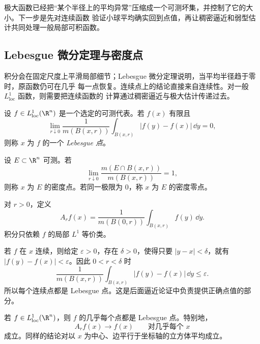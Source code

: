 极大函数已经把“某个半径上的平均异常”压缩成一个可测坏集，并控制了它的大小。下一步是先对连续函数
验证小球平均确实回到点值，再让稠密逼近和弱型估计共同处理一般局部可积函数。

\subsection{Lebesgue 微分定理与密度点}\label{subsec:4-1-2}

积分会在固定尺度上平滑局部细节；Lebesgue 微分定理说明，当平均半径趋于零时，原函数仍可在几乎
每一点恢复。连续点上的结论直接来自连续性。对一般 $L^1_{\mathrm{loc}}$ 函数，则需要把连续函数的
计算通过稠密逼近与极大估计传递过去。

\begin{definition}[Lebesgue 点]\label{def:4-1-2-1}
设 $f\in L^1_{\mathrm{loc}}(\R^n)$ 是一个选定的可测代表。若 $f(x)$ 有限且
\[
 \lim_{r\downarrow0}\frac1{m(B(x,r))}
       \int_{B(x,r)}|f(y)-f(x)|\,\dd y=0,
\]
则称 $x$ 为 $f$ 的一个 \emph{Lebesgue 点}。
\end{definition}

\begin{definition}[密度点]\label{def:4-1-2-2}
设 $E\subset\R^n$ 可测。若
\[
 \lim_{r\downarrow0}\frac{m(E\cap B(x,r))}{m(B(x,r))}=1,
\]
则称 $x$ 为 $E$ 的密度点。若同一极限为 $0$，称 $x$ 为 $E$ 的密度零点。
\end{definition}

\begin{definition}[平均算子]\label{def:4-1-2-3}
对 $r>0$，定义
\[
 A_rf(x)=\frac1{m(B(0,r))}\int_{B(x,r)}f(y)\,\dd y.
\]
积分只依赖 $f$ 的局部 $L^1$ 等价类。
\end{definition}

\begin{example}[连续点]\label{ex:4-1-2-1}
若 $f$ 在 $x$ 连续，则给定 $\varepsilon>0$，存在 $\delta>0$，使得只要
$|y-x|<\delta$，就有 $|f(y)-f(x)|<\varepsilon$。因此 $0<r<\delta$ 时
\[
 \frac1{m(B(x,r))}\int_{B(x,r)}|f(y)-f(x)|\,\dd y\le\varepsilon.
\]
所以每个连续点都是 Lebesgue 点。这是后面逼近论证中负责提供正确点值的部分。
\end{example}

\begin{theorem}\label{theorem:4-1-2-1}
若 $f\in L^1_{\mathrm{loc}}(\R^n)$，则 $f$ 的几乎每个点都是 Lebesgue 点。特别地，
\[
  A_rf(x)\longrightarrow f(x)\qquad\text{对几乎每个 }x
\]
成立。同样的结论对以 $x$ 为中心、边平行于坐标轴的立方体平均成立。
\end{theorem}


